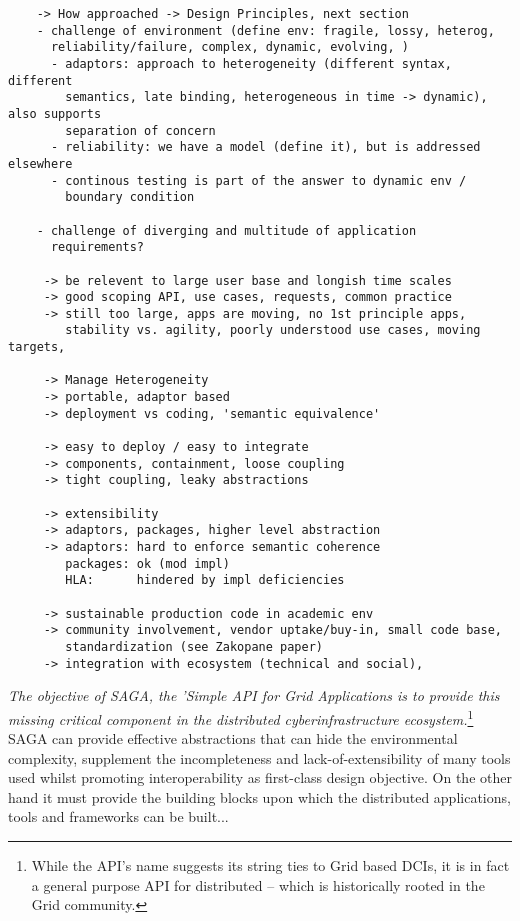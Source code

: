 \documentclass[a4paper,10pt]{article}
\begin{document}
\begin{verbatim}
    -> How approached -> Design Principles, next section
    - challenge of environment (define env: fragile, lossy, heterog,
      reliability/failure, complex, dynamic, evolving, ) 
      - adaptors: approach to heterogeneity (different syntax, different
        semantics, late binding, heterogeneous in time -> dynamic), also supports 
        separation of concern
      - reliability: we have a model (define it), but is addressed elsewhere
      - continous testing is part of the answer to dynamic env /
        boundary condition

    - challenge of diverging and multitude of application
      requirements?

     -> be relevent to large user base and longish time scales
     -> good scoping API, use cases, requests, common practice
     -> still too large, apps are moving, no 1st principle apps,
        stability vs. agility, poorly understood use cases, moving targets, 

     -> Manage Heterogeneity
     -> portable, adaptor based
     -> deployment vs coding, 'semantic equivalence'
  
     -> easy to deploy / easy to integrate
     -> components, containment, loose coupling
     -> tight coupling, leaky abstractions
  
     -> extensibility
     -> adaptors, packages, higher level abstraction
     -> adaptors: hard to enforce semantic coherence
        packages: ok (mod impl)
        HLA:      hindered by impl deficiencies
  
     -> sustainable production code in academic env
     -> community involvement, vendor uptake/buy-in, small code base,
        standardization (see Zakopane paper)
     -> integration with ecosystem (technical and social), 
   \end{verbatim}

 {\it The objective of SAGA, the 'Simple API for Grid Applications is
   to provide this missing critical component in the distributed
   cyberinfrastructure ecosystem.}\footnote{While the API's name
   suggests its string ties to Grid based DCIs, it is in fact a
   general purpose API for distributed -- which is historically rooted
   in the Grid community.}  SAGA can provide effective abstractions
 that can hide the environmental complexity, supplement the
 incompleteness and lack-of-extensibility of many tools used whilst
 promoting interoperability as first-class design objective.  On the
 other hand it must provide the building blocks upon which the
 distributed applications, tools and frameworks can be built...
\end{document}
